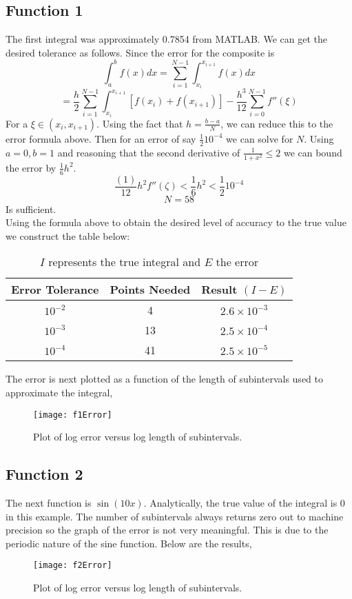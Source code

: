 \documentclass[]{article}
\begin{document}
\subsection{Function 1} 
The first integral was approximately 0.7854 from MATLAB. We can get the desired tolerance as follows. Since the error for the composite is 
\[
\int_{a}^{b} f(x) dx =  \sum_{i=1}^{N-1} \int_{x_i}^{x_{i+1}} f(x) dx
\]
\[
= \frac{h}{2} \sum_{i=1}^{N-1} \int_{x_i}^{x_{i+1}} [f(x_i) + f(x_{i+1})] - \frac{h^3}{12} \sum_{i=0}^{N-1} f''(\xi)
\]
For a $ \xi \in (x_i, x_{i+1}) $. Using the fact that $ h = \frac{b-a}{N} $, we can reduce this to the error formula above. Then for an error of say $ \frac{1}{2} 10^{-4} $ we can solve for $ N $. Using $ a=0, b =1$ and reasoning that the second derivative of $ \frac{1}{1+x^2} \leq 2 $ we can bound the error by $ \frac{1}{6} h^2  $. 
\[ 
\frac{(1)}{12} h^2 f''(\zeta)< \frac{1}{6} h^2 < \frac{1}{2} 10^{-4} 
 \]
 \[ 
 N = 58 
 \]
 Is sufficient. 
 \\
Using the formula above to obtain the desired level of accuracy to the true value we construct the table below: 


	\begin{table}[H]
\centering
	\begin{tabular}{ccc}
		Error Tolerance & Points Needed & Result $ (I - E) $\\
		\hline 
		$ 10 ^{-2} $ & 4 & $ 2.6 \times 10^{-3}$ \\
		$ 10^{-3} $ & 13 & $  2.5 \times 10^{-4} $ \\
		$ 10^{-4} $ & 41 & $ 2.5\times 10^{-5} $
	\end{tabular}
	\caption{$ I  $ represents the true integral and $ E  $ the error}
		\end{table}

The error is next plotted as a function of the length of subintervals used to approximate the integral, 

\begin{figure}[H]
	\centering
	\texttt{[image: f1Error]}
	\caption{Plot of log error versus log length of subintervals.}
\end{figure}

\subsection*{Function 2}
The next function is $ \sin(10x) $. Analytically, the true value of the integral is 0 in this example. The number of subintervals always returns zero out to machine precision so the graph of the error is not very meaningful. This is due to the periodic nature of the sine function. Below are the results, 
\begin{figure}[H]
	\centering
	\texttt{[image: f2Error]}
\caption{Plot of log error versus log length of subintervals.}
\end{figure}
\end{document}
